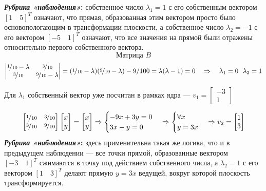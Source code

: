 \documentclass[a3paper,14pt]{extarticle}
\begin{document}
\textbf{\textit{Рубрика «наблюдения»}:} собственное число $\lambda_1 = 1$ с его собственным вектором $\left[1 \quad 5\right]^T$ означают, что прямая, образованная этим вектором просто было основопологающим в трансформации плоскости, а собственное число $\lambda_2 = -1$ с его вектором $\left[-5 \quad 1\right]^T$ означают, что все значения на прямой были отражены относительно первого собственного вектора.\\[1.5em]
$$\text{Матрица } B$$
$$\begin{vmatrix}
    \nicefrac{1}{10}-\lambda & \nicefrac{3}{10} \\
    \nicefrac{3}{10} & \nicefrac{9}{10}-\lambda
\end{vmatrix} = (\nicefrac{1}{10}-\lambda)(\nicefrac{9}{10}-\lambda) - 9/100 = \lambda(\lambda - 1) = 0 \quad\Rightarrow\quad \lambda_1 = 0\ \ \lambda_2 = 1$$
\begin{center}
    Для $\lambda_1$ собственный вектор уже посчитан в рамках ядра --- $v_1 = \begin{bmatrix}
        -3 \\ 1
    \end{bmatrix}$
\end{center}
$$\begin{bmatrix}
    \nicefrac{1}{10} & \nicefrac{3}{10} \\ \nicefrac{3}{10} & \nicefrac{9}{10}
\end{bmatrix}\begin{bmatrix}
    x \\ y
\end{bmatrix} = \begin{bmatrix}
    x \\ y
\end{bmatrix} \Rightarrow \begin{cases}
    -9x + 3y = 0 \\ 3x - y = 0
\end{cases} \Rightarrow \begin{cases}
    \forall x \\
    y = 3x
\end{cases} \Rightarrow v_2 = \begin{bmatrix}
    1 \\ 3
\end{bmatrix}$$
\textbf{\textit{Рубрика «наблюдения»}:} здесь применительна такая же логика, что и в предыдущем наблюдении --- все точки прямой, образованные вектором $\left[-3 \quad 1\right]^T$ сжимаются в точку под действием собственного числа, а $\lambda_2 = 1$ с его вектором $\left[1 \quad 3\right]^T$ делают прямую $y = 3x$ ведущей, вокруг которой плоскость трансформируется.\\[1.5em]
\end{document}
